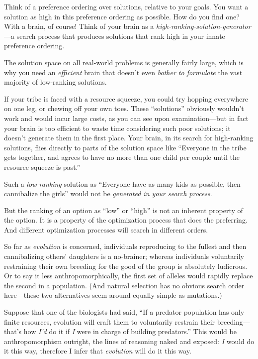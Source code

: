 {
 Think of a preference ordering over solutions, relative to your
goals. You want a solution as high in this preference ordering as
possible. How do you find one? With a brain, of course! Think of your
brain as a \textit{high-ranking-solution-generator}{}---a search
process that produces solutions that rank high in your innate
preference ordering.}

{
 The solution space on all real-world problems is generally fairly
large, which is why you need an \textit{efficient} brain that
doesn't even \textit{bother to formulate} the vast
majority of low-ranking solutions.}

{
 If your tribe is faced with a resource squeeze, you could try
hopping everywhere on one leg, or chewing off your own toes. These
``solutions'' obviously
wouldn't work and would incur large costs, as you can
see upon examination---but in fact your brain is too efficient to waste
time considering such poor solutions; it doesn't
generate them in the first place. Your brain, in its search for
high-ranking solutions, flies directly to parts of the solution space
like ``Everyone in the tribe gets together, and agrees
to have no more than one child per couple until the resource squeeze is
past.''}

{
 Such a \textit{low-ranking} solution as
``Everyone have as many kids as possible, then
cannibalize the girls'' would not be
\textit{generated in your search process}.}

{
 But the ranking of an option as
``low'' or
``high'' is not an inherent property
of the option. It is a property of the optimization process that does
the preferring. And different optimization processes will search in
different orders.}

{
 So far as \textit{evolution} is concerned, individuals reproducing
to the fullest and then cannibalizing others' daughters
is a no-brainer; whereas individuals voluntarily restraining their own
breeding for the good of the group is absolutely ludicrous. Or to say
it less anthropomorphically, the first set of alleles would rapidly
replace the second in a population. (And natural selection has no
obvious search order here---these two alternatives seem around equally
simple as mutations.)}

{
 Suppose that one of the biologists had said, ``If
a predator population has only finite resources, evolution will craft
them to voluntarily restrain their breeding---that's
how \textit{I'd} do it if \textit{I} were in charge of
building predators.'' This would be anthropomorphism
outright, the lines of reasoning naked and exposed: \textit{I} would do
it this way, therefore I infer that \textit{evolution} will do it this
way.}


